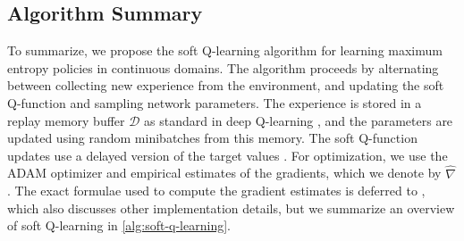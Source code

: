 \documentclass{article}
\begin{document}
\vspace{-2mm}
\subsection{Algorithm Summary}
\label{sec:alg}
\vspace{-1mm}
To summarize, we propose the soft Q-learning algorithm for learning maximum entropy policies in continuous domains. The algorithm proceeds by alternating between collecting new experience from the environment, and updating the soft Q-function and sampling network parameters.  The experience is stored in a replay memory buffer $\mathcal{D}$ as standard in deep Q-learning \cite{mnih2013playing}, and the parameters are updated using random minibatches from this memory. The soft Q-function updates use a delayed version of the target values \cite{mnih2015human}. For optimization, we use the ADAM \cite{kingma2014adam} optimizer and empirical estimates of the gradients, which we denote by $\hat \nabla$. The exact formulae used to compute the gradient estimates is deferred to , which also discusses other implementation details, but we summarize an overview of soft Q-learning in \autoref{alg:soft-q-learning}.
\end{document}
